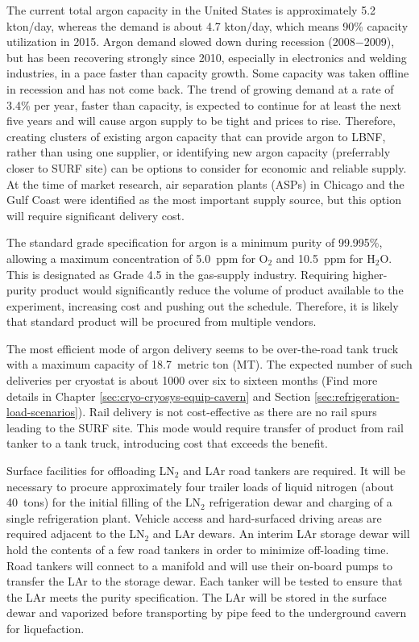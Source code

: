 The current total argon capacity in the United States is approximately 5.2 kton/day, 
whereas the demand is about 4.7 kton/day, which means 90\% capacity utilization in 
2015. Argon demand slowed down during recession (2008$-$2009), but has been 
recovering strongly since 2010, especially in electronics and welding industries, 
in a pace faster than capacity growth. Some capacity was taken offline in recession 
and has not come back. The trend of growing demand at a rate of 3.4\% per year, 
faster than capacity, is expected to continue for at least the next five years and 
will cause argon supply to be tight and prices to rise. Therefore, creating clusters 
of existing argon capacity that can provide argon to LBNF, rather than using one 
supplier, or identifying new argon capacity (preferrably closer to SURF site) can 
be options to consider for economic and reliable supply. At the time of market 
research, air separation plants (ASPs) in Chicago and the Gulf Coast were 
identified as the most important supply source, but this option will 
require significant delivery cost.

The standard grade specification for argon is a minimum purity of
 99.995\%, allowing a maximum concentration of 5.0~ppm for O$_2$ 
and 10.5~ppm for H$_{2}$O.  This is designated as Grade 4.5 in 
the gas-supply industry.  Requiring higher-purity product would 
significantly reduce the volume of product available to the 
experiment, increasing cost and pushing out the schedule.  
Therefore, it is likely that standard product will be 
procured from multiple vendors.  

The most efficient mode of argon delivery seems to be
over-the-road tank truck with a maximum capacity of 18.7~metric ton (MT).  
The expected number of such deliveries per cryostat is about 1000 
over six to sixteen months (Find more details in 
Chapter \ref{sec:cryo-cryosys-equip-cavern} and Section 
\ref{sec:refrigeration-load-scenarios}). 
Rail delivery is not cost-effective as there are no rail spurs leading
to the SURF site. This mode would require transfer of product from rail 
tanker to a tank truck, introducing cost that exceeds the benefit.

Surface facilities for offloading LN$_{2}$ and LAr road tankers are 
required. It will be necessary to  procure approximately four trailer 
loads of liquid nitrogen (about 40~tons) for the initial filling of 
the LN$_{2}$ refrigeration dewar and charging of a single refrigeration 
plant. Vehicle access and hard-surfaced driving areas are required 
adjacent to the LN$_{2}$ and LAr dewars. An interim 
LAr storage dewar will hold the contents of a few road tankers in order 
to minimize off-loading time.  Road tankers will connect to a 
manifold and will use their on-board pumps to transfer the LAr 
to the storage dewar. Each tanker will be tested to ensure that 
the LAr meets the purity specification. The LAr will be 
stored in the surface dewar and vaporized before transporting 
by pipe feed to the underground cavern for liquefaction.

